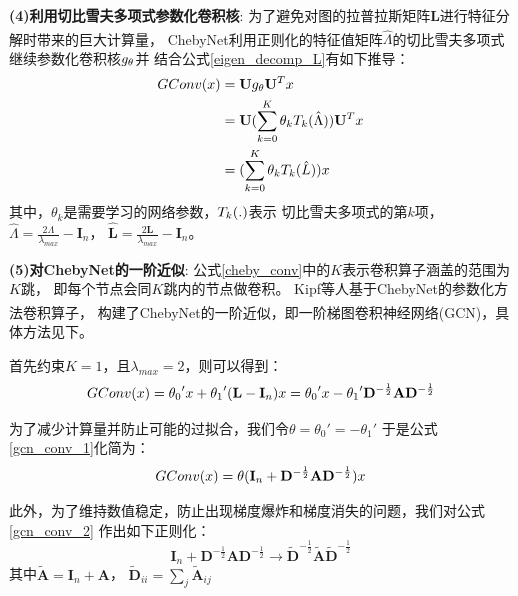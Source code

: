   \textbf{(4)利用切比雪夫多项式参数化卷积核}:
  为了避免对图的拉普拉斯矩阵$\mathbf{L}$进行特征分解时带来的巨大计算量，
  ChebyNet\textsuperscript{\cite{ChebyNet}}利用正则化的特征值矩阵$\hat{\Lambda}$的切比雪夫多项式
  继续参数化卷积核$\mathnormal{g}_\theta$并
  结合公式\ref*{eigen_decomp_L}有如下推导：
  \begin{align} \label{cheby_conv}
      GConv(\mathnormal{x}) &= \mathbf{U} \mathnormal{g}_\theta \mathbf{U}^T \mathnormal{x} \notag\\
      &= \mathbf{U} (\sum^{K}_{k=0}\theta_k\mathnormal{T}_k(\hat{\Lambda}) ) 
          \mathbf{U}^T \mathnormal{x}\notag \\
      &=  (\sum^{K}_{k=0}\theta_k\mathnormal{T}_k(\hat{\mathnormal{L}}) ) 
           \mathnormal{x} \notag \\ 
  \end{align}
  其中，$\theta_k$是需要学习的网络参数，$\mathnormal{T}_k(.)$表示
  切比雪夫多项式的第$k$项，
  $\hat{\Lambda} = \frac{2\Lambda}{\lambda_{max}} - \mathbf{I}_n$，
  $\hat{\mathbf{L}} = \frac{2\mathbf{L}}{\lambda_{max}} - \mathbf{I}_n$。
  
  \textbf{(5)对ChebyNet的一阶近似}:
  公式\ref*{cheby_conv}中的$K$表示卷积算子涵盖的范围为$K$跳，
  即每个节点会同$K$跳内的节点做卷积。
  Kipf等人基于ChebyNet的参数化方法卷积算子，
  构建了ChebyNet的一阶近似，即一阶梯图卷积神经网络(GCN)\textsuperscript{\cite{kipfGCN}}，具体方法见下。

  首先约束$K = 1$，且$\lambda_{max} = 2$，则可以得到：
  \begin{equation} \label{gcn_conv_1}
    GConv(\mathnormal{x}) = {\theta_0}'\mathnormal{x} + {\theta_1}'(\mathbf{L}-\mathbf{I}_n)\mathnormal{x}
    = {\theta_0}'\mathnormal{x} - {\theta_1}'\mathbf{D}^{-\frac{1}{2}}\mathbf{A}\mathbf{D}^{-\frac{1}{2}}
  \end{equation}

  为了减少计算量并防止可能的过拟合，我们令$\theta = {\theta_0}' = -{\theta_1}'$
  于是公式\ref*{gcn_conv_1}化简为：
  \begin{equation} \label{gcn_conv_2}
    GConv(\mathnormal{x}) = \theta(\mathbf{I}_n + 
    \mathbf{D}^{-\frac{1}{2}}\mathbf{A}\mathbf{D}^{-\frac{1}{2}})\mathnormal{x}
  \end{equation}

  此外，为了维持数值稳定，防止出现梯度爆炸和梯度消失的问题，我们对公式\ref*{gcn_conv_2}
  作出如下正则化：
  \begin{equation} \label{gcn_conv_3}
    \mathbf{I}_n + \mathbf{D}^{-\frac{1}{2}}\mathbf{A}\mathbf{D}^{-\frac{1}{2}} 
    \rightarrow
    \tilde{\mathbf{D}}^{-\frac{1}{2}} \tilde{\mathbf{A}} \tilde{\mathbf{D}}^{-\frac{1}{2}} 
  \end{equation}
  其中$\tilde{\mathbf{A}} = \mathbf{I}_n + \mathbf{A}$， 
  $\tilde{\mathbf{D}}_{ii} = \sum_j\tilde{\mathbf{A}}_{ij}$

